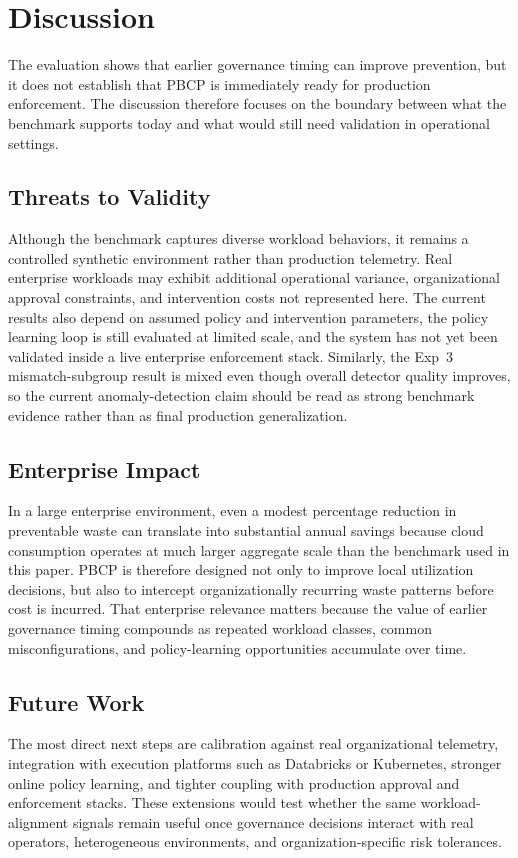 \section{Discussion}


The evaluation shows that earlier governance timing can improve prevention, but
it does not establish that PBCP is immediately ready for production enforcement.
The discussion therefore focuses on the boundary between what the benchmark
supports today and what would still need validation in operational settings.

\subsection{Threats to Validity}

Although the benchmark captures diverse workload behaviors, it remains a
controlled synthetic environment rather than production telemetry. Real
enterprise workloads may exhibit additional operational variance, organizational
approval constraints, and intervention costs not represented here. The current
results also depend on assumed policy and intervention parameters, the policy
learning loop is still evaluated at limited scale, and the system has not yet
been validated inside a live enterprise enforcement stack. Similarly, the
Exp~3 mismatch-subgroup result is mixed even though overall detector quality
improves, so the current anomaly-detection claim should be read as strong
benchmark evidence rather than as final production generalization.

\subsection{Enterprise Impact}

In a large enterprise environment, even a modest percentage reduction in
preventable waste can translate into substantial annual savings because cloud
consumption operates at much larger aggregate scale than the benchmark used in
this paper. PBCP is therefore designed not only to improve local utilization
decisions, but also to intercept organizationally recurring waste patterns
before cost is incurred. That enterprise relevance matters because the value of
earlier governance timing compounds as repeated workload classes, common
misconfigurations, and policy-learning opportunities accumulate over time.

\subsection{Future Work}

The most direct next steps are calibration against real organizational telemetry,
integration with execution platforms such as Databricks or Kubernetes, stronger
online policy learning, and tighter coupling with production approval and
enforcement stacks. These extensions would test whether the same
workload-alignment signals remain useful once governance decisions interact with
real operators, heterogeneous environments, and organization-specific risk
tolerances.



